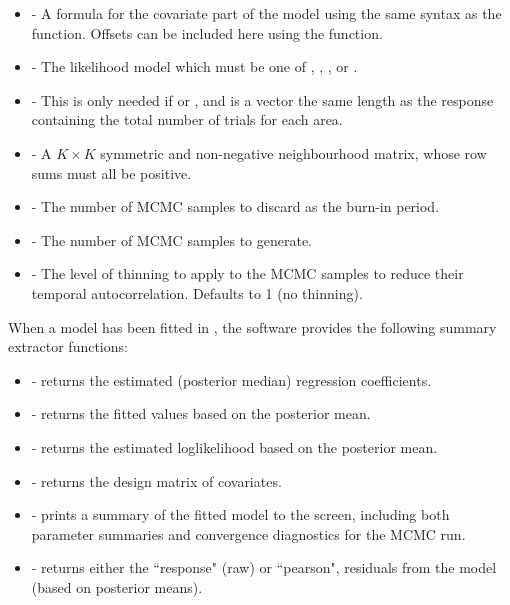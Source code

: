 \documentclass[article,shortnames,nojss]{jss}
\begin{document}
\begin{itemize}
\item {} - A formula for the covariate part of the model using the same syntax as the  function. Offsets can be included here using the  function.

\item {} - The likelihood model which must  be one of , , ,  or .

\item {} - This is only needed if   or , and is a vector the same length as the response containing the total number of trials  for each area. 

\item {} - A $K \times K$ symmetric and non-negative neighbourhood matrix, whose row sums must all be positive.

\item {} - The number of MCMC samples to discard as the burn-in period.
    
\item {} - The number of MCMC samples to generate.

\item {} - The level of thinning to apply to the MCMC samples to reduce their temporal autocorrelation. Defaults to 1 (no thinning).
\end{itemize}

When a model has been fitted in , the software provides the following summary extractor functions: 


\begin{itemize}
\item {} - returns the estimated (posterior median) regression coefficients. 
\item {} - returns the fitted values based on the posterior mean.
\item {} - returns the estimated loglikelihood based on the posterior mean.
\item {} - returns the design matrix of covariates.
\item {} - prints a summary of the fitted model to the screen, including both parameter summaries and convergence diagnostics for the MCMC run.
\item {} - returns either the ``response" (raw) or ``pearson", residuals from the model (based on posterior means).
\end{itemize}
\end{document}
